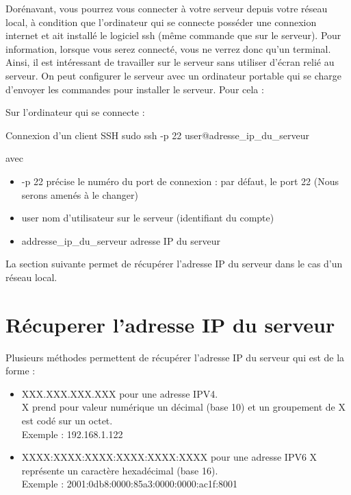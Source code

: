 Dorénavant, vous pourrez vous connecter à votre serveur depuis votre réseau local, à condition que l’ordinateur qui se connecte posséder une connexion internet et ait installé le logiciel ssh (même commande que sur le serveur).
Pour information, lorsque vous serez connecté, vous ne verrez donc qu’un terminal. \\

Ainsi, il est intéressant de travailler sur le serveur sans utiliser d’écran relié au serveur. On peut configurer le serveur avec un ordinateur portable qui se charge d’envoyer les commandes pour installer le serveur. Pour cela : 

Sur l’ordinateur qui se connecte :

\begin{Bash} {Connexion d'un client SSH}
sudo ssh -p 22 user@adresse_ip_du_serveur
\end{Bash}


avec 
\begin{itemize}
    \item -p 22 précise le numéro du port de connexion : par défaut, le      
 					port 22 (Nous serons amenés à le changer)
 	\item user nom d’utilisateur sur le serveur (identifiant du compte)
 	\item addresse\_ip\_du\_serveur	adresse IP du serveur
\end{itemize}

La section suivante permet de récupérer l’adresse IP du serveur dans le cas d’un réseau local.

\section{Récuperer l'adresse IP du serveur}

Plusieurs méthodes permettent de récupérer l’adresse IP du serveur qui est de la forme :

\begin{itemize}
    \item XXX.XXX.XXX.XXX pour une adresse IPV4. \\
X prend pour valeur numérique un décimal (base 10) et un groupement de X est codé sur un octet. \\
Exemple : 192.168.1.122

\item XXXX:XXXX:XXXX:XXXX:XXXX:XXXX pour une adresse IPV6 
X représente un caractère hexadécimal (base 16). \\
Exemple : 2001:0db8:0000:85a3:0000:0000:ac1f:8001
\end{itemize}

